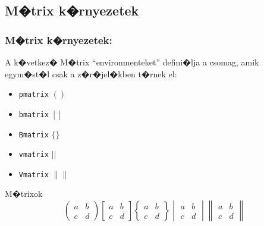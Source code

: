 \documentclass[xcolor=pdftex,dvipsnames,table,compress,bigger]{beamer}
\begin{document}
\subsection{M�trix k�rnyezetek}
\begin{frame}[fragile]
    \frametitle{M�trix k�rnyezetek:}
    A k�vetkez� M�trix ``environmenteket'' defini�lja a csomag, amik egym�st�l csak a z�r�jel�kben t�rnek el:
    \begin{itemize}
    \item \verb*|pmatrix| $()$
    \item \verb*|bmatrix| $[]$
    \item \verb*|Bmatrix| $\{\}$
    \item \verb*|vmatrix| $||$
    \item \verb*|Vmatrix| $\left\|\right\|$
    \end{itemize}
    \begin{block}{M�trixok}
    	\[
    	\begin{pmatrix}
    	a&b\\
    	c&d
    	\end{pmatrix}
    	\begin{bmatrix}
    	a&b\\
    	c&d
    	\end{bmatrix}
    	\begin{Bmatrix}
    	a&b\\
    	c&d
    	\end{Bmatrix}
    	\begin{vmatrix}
    	a&b\\
    	c&d
    	\end{vmatrix}
    	\begin{Vmatrix}
    	a&b\\
    	c&d
    	\end{Vmatrix}
    	\]
    \end{block}
\end{frame}

\end{document}
